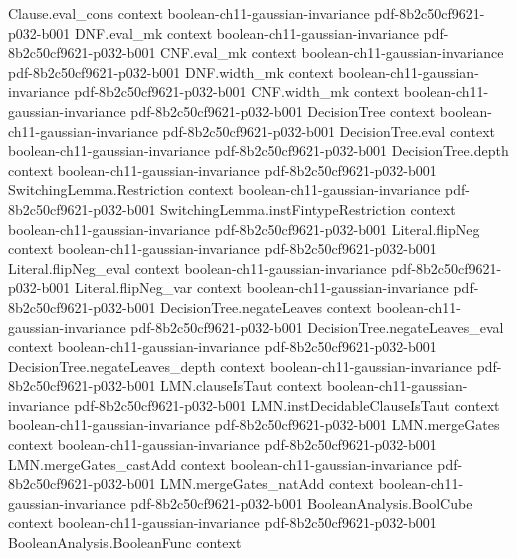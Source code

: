 \begin{theorem}
\proofstep
  {Clause.eval_cons}
  {context}
  {boolean-ch11-gaussian-invariance}
  {pdf-8b2c50cf9621-p032-b001}
\proofstep
  {DNF.eval_mk}
  {context}
  {boolean-ch11-gaussian-invariance}
  {pdf-8b2c50cf9621-p032-b001}
\proofstep
  {CNF.eval_mk}
  {context}
  {boolean-ch11-gaussian-invariance}
  {pdf-8b2c50cf9621-p032-b001}
\proofstep
  {DNF.width_mk}
  {context}
  {boolean-ch11-gaussian-invariance}
  {pdf-8b2c50cf9621-p032-b001}
\proofstep
  {CNF.width_mk}
  {context}
  {boolean-ch11-gaussian-invariance}
  {pdf-8b2c50cf9621-p032-b001}
\proofstep
  {DecisionTree}
  {context}
  {boolean-ch11-gaussian-invariance}
  {pdf-8b2c50cf9621-p032-b001}
\proofstep
  {DecisionTree.eval}
  {context}
  {boolean-ch11-gaussian-invariance}
  {pdf-8b2c50cf9621-p032-b001}
\proofstep
  {DecisionTree.depth}
  {context}
  {boolean-ch11-gaussian-invariance}
  {pdf-8b2c50cf9621-p032-b001}
\proofstep
  {SwitchingLemma.Restriction}
  {context}
  {boolean-ch11-gaussian-invariance}
  {pdf-8b2c50cf9621-p032-b001}
\proofstep
  {SwitchingLemma.instFintypeRestriction}
  {context}
  {boolean-ch11-gaussian-invariance}
  {pdf-8b2c50cf9621-p032-b001}
\proofstep
  {Literal.flipNeg}
  {context}
  {boolean-ch11-gaussian-invariance}
  {pdf-8b2c50cf9621-p032-b001}
\proofstep
  {Literal.flipNeg_eval}
  {context}
  {boolean-ch11-gaussian-invariance}
  {pdf-8b2c50cf9621-p032-b001}
\proofstep
  {Literal.flipNeg_var}
  {context}
  {boolean-ch11-gaussian-invariance}
  {pdf-8b2c50cf9621-p032-b001}
\proofstep
  {DecisionTree.negateLeaves}
  {context}
  {boolean-ch11-gaussian-invariance}
  {pdf-8b2c50cf9621-p032-b001}
\proofstep
  {DecisionTree.negateLeaves_eval}
  {context}
  {boolean-ch11-gaussian-invariance}
  {pdf-8b2c50cf9621-p032-b001}
\proofstep
  {DecisionTree.negateLeaves_depth}
  {context}
  {boolean-ch11-gaussian-invariance}
  {pdf-8b2c50cf9621-p032-b001}
\proofstep
  {LMN.clauseIsTaut}
  {context}
  {boolean-ch11-gaussian-invariance}
  {pdf-8b2c50cf9621-p032-b001}
\proofstep
  {LMN.instDecidableClauseIsTaut}
  {context}
  {boolean-ch11-gaussian-invariance}
  {pdf-8b2c50cf9621-p032-b001}
\proofstep
  {LMN.mergeGates}
  {context}
  {boolean-ch11-gaussian-invariance}
  {pdf-8b2c50cf9621-p032-b001}
\proofstep
  {LMN.mergeGates_castAdd}
  {context}
  {boolean-ch11-gaussian-invariance}
  {pdf-8b2c50cf9621-p032-b001}
\proofstep
  {LMN.mergeGates_natAdd}
  {context}
  {boolean-ch11-gaussian-invariance}
  {pdf-8b2c50cf9621-p032-b001}
\proofstep
  {BooleanAnalysis.BoolCube}
  {context}
  {boolean-ch11-gaussian-invariance}
  {pdf-8b2c50cf9621-p032-b001}
\proofstep
  {BooleanAnalysis.BooleanFunc}
  {context}

\end{theorem}
